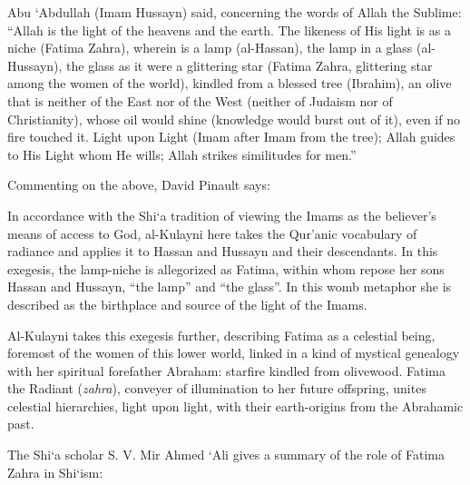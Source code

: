 \begin{quotex}
Abu `Abdullah (Imam Hussayn) said, concerning the words of Allah the Sublime: ``Allah is the light of the heavens and the earth. The likeness of His light is as a niche (Fatima Zahra), wherein is a lamp (al-Hassan), the lamp in a glass (al-Hussayn), the glass as it were a glittering star (Fatima Zahra, glittering star among the women of the world), kindled from a blessed tree (Ibrahim), an olive that is neither of the East nor of the West (neither of Judaism nor of Christianity), whose oil would shine (knowledge would burst out of it), even if no fire touched it. Light upon Light (Imam after Imam from the tree); Allah guides to His Light whom He wills; Allah strikes similitudes for men.''
\end{quotex}


Commenting on the above, David Pinault says:

\begin{quotationx}
In accordance with the Shi`a tradition of viewing the Imams as the believer's means of access to God, al-Kulayni here takes the Qur'anic vocabulary of radiance and applies it to Hassan and Hussayn and their descendants. In this exegesis, the lamp-niche is allegorized as Fatima, within whom repose her sons Hassan and Hussayn, ``the lamp'' and ``the glass''. In this womb metaphor she is described as the birthplace and source of the light of the Imams.

Al-Kulayni takes this exegesis further, describing Fatima as a celestial being, foremost of the women of this lower world, linked in a kind of mystical genealogy with her spiritual forefather Abraham: starfire kindled from olivewood. Fatima the Radiant (\emph{zahra}), conveyer of illumination to her future offspring, unites celestial hierarchies, light upon light, with their earth-origins from the Abrahamic past.
\end{quotationx}

The Shi`a scholar S. V. Mir Ahmed `Ali gives a summary of the role of Fatima Zahra in Shi`ism:

